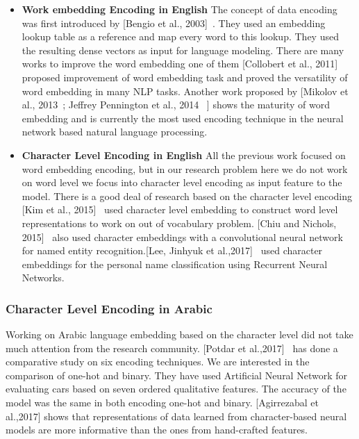 \begin{itemize}
  \item \textbf{Work embedding Encoding in English} The concept of data encoding was first introduced by [Bengio et al., 2003]~\cite{Bengio2003}. They used an embedding lookup table as a reference and map every word to this lookup. They used the resulting dense vectors as input for language modeling. There are many works to improve the word embedding one of them [Collobert et al., 2011]~\cite{Collobert_2011} proposed improvement of word embedding task and proved the versatility of word embedding in many NLP tasks. Another work proposed by [Mikolov et al., 2013~\cite{Mikolov_2013};
  Jeffrey Pennington et al., 2014~\cite{Pennington_2014} ] shows the maturity of word embedding and is currently the most used encoding technique in the neural network based natural language processing.

  \item \textbf{Character Level Encoding in English} 
  All the previous work focused on word embedding encoding, but in our research problem here we do not work on word level we focus into character level encoding as input feature to the model. There is a good deal of research based on the character level encoding [Kim et al., 2015]~\cite{Kim_2015} used character level embedding to construct word level representations to work on out of vocabulary problem. [Chiu and Nichols, 2015]~\cite{Chiu_2015} also used character embeddings with a convolutional neural network for named entity recognition.[Lee, Jinhyuk et al.,2017]~\cite{ijcai_2017} used character embeddings for the personal name classification using Recurrent Neural Networks.

\end{itemize}

\subsubsection{Character Level Encoding in Arabic}\label{sec:Char_Level_Arabic}

Working on Arabic language embedding based on the character level did not take much attention from the research community. [Potdar et al.,2017]~\cite{Potdar_2017} has done a comparative study on six encoding techniques. We are interested in the comparison of one-hot and binary. They have used Artificial Neural Network for evaluating cars based on seven ordered qualitative features. The accuracy of the model was the same in both encoding one-hot and binary. [Agirrezabal et al.,2017]\cite{Agirrezabal_2017} shows that representations of data learned from character-based neural models are more informative than the ones from hand-crafted features.

